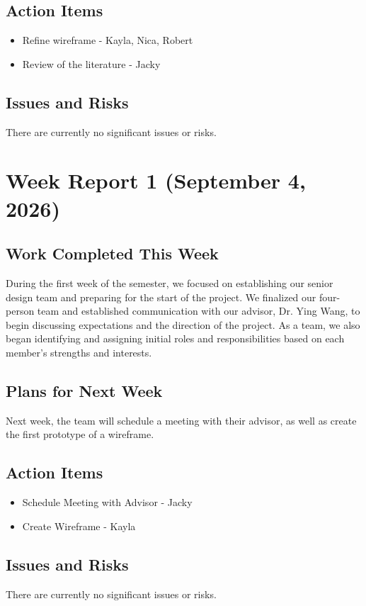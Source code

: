 \subsection{Action Items}
\begin{itemize}
    \item Refine wireframe - Kayla, Nica, Robert
    \item Review of the literature - Jacky
\end{itemize}

\subsection{Issues and Risks}
There are currently no significant issues or risks.

\section{Week Report 1 (September 4, 2026)}
\subsection{Work Completed This Week}
During the first week of the semester, we focused on establishing our senior design team and preparing for the start of the project. We finalized our four-person team and established communication with our advisor, Dr. Ying Wang, to begin discussing expectations and the direction of the project. As a team, we also began identifying and assigning initial roles and responsibilities based on each member’s strengths and interests.

\subsection{Plans for Next Week}
Next week, the team will schedule a meeting with their advisor, as well as create the first prototype of a wireframe.

\subsection{Action Items}
\begin{itemize}
    \item Schedule Meeting with Advisor - Jacky
    \item Create Wireframe - Kayla
\end{itemize}

\subsection{Issues and Risks}
There are currently no
significant issues or risks.


